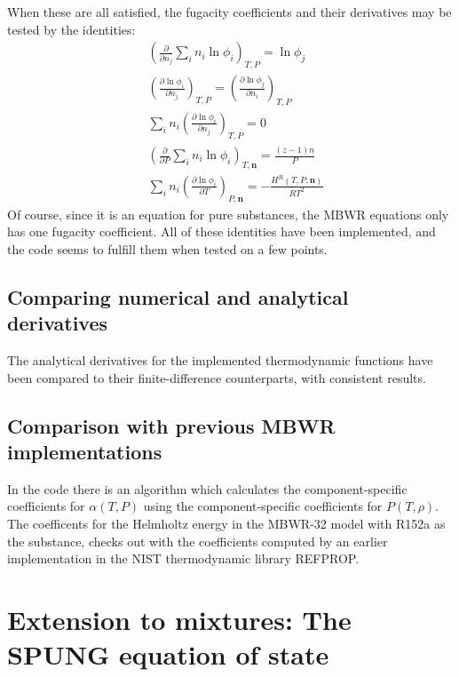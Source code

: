 \documentclass[internal,english]{sintefmemo2012}
\newcommand*{\pder}[2]{\left(\frac{\partial #1}{\partial #2}\right)}
\numberwithin{equation}{section}
\begin{document}
When these are all satisfied, the fugacity coefficients and their
derivatives may be tested by the identities:
\begin{align}
  \label{test:4}
  & \left( \frac{\partial}{\partial n_j} \sum_i n_i \ln \phi_i \right)_{T,P} = \ln \phi_j \\
  \label{test:5}
  & \pder{\ln \phi_i}{n_j}_{T,P} = \pder{\ln \phi_j}{n_i}_{T,P} \\
  \label{test:6}
  & \sum_i n_i \pder{\ln \phi_i}{n_j}_{T,P} = 0 \\
  \label{test:7}
  & \left( \frac{\partial}{\partial P} \sum_i n_i \ln \phi_i \right)_{T,\textbf{n}} = \frac{(z-1) n}{P} \\
  \label{test:8}
  & \sum_i n_i \pder{ \ln \phi_i}{T}_{P,\textbf{n}} =
  -\frac{H^R(T,P,\textbf{n})}{RT^2}
\end{align}
Of course, since it is an equation for pure substances, the MBWR
equations only has one fugacity
coefficient. All of these identities have been implemented, and the
code seems to fulfill them when tested on a few points.

\subsection{Comparing numerical and analytical derivatives}
The analytical derivatives for the implemented thermodynamic functions
have been compared to their finite-difference counterparts, with
consistent results.

\subsection{Comparison with previous MBWR implementations}
In the code there is an algorithm which calculates the component-specific coefficients for $\alpha(T,P)$ using the component-specific coefficients for $P(T,\rho)$. The coefficents for the Helmholtz energy in the MBWR-32 model with R152a as the substance, checks out with the coefficients computed by an earlier implementation in the NIST thermodynamic library REFPROP.

\section{Extension to mixtures: The SPUNG equation of state}
\end{document}

